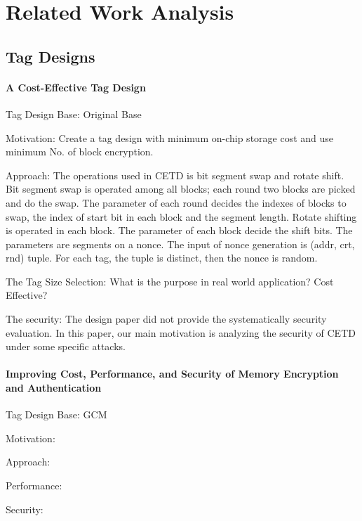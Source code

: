 \documentclass{article}
\begin{document}
\section{Related Work Analysis}
\subsection{Tag Designs}
\paragraph{A Cost-Effective Tag Design}
Tag Design Base: Original Base

Motivation: Create a tag design with minimum on-chip storage cost and use
minimum No. of block encryption.

Approach: The operations used in CETD is bit segment swap and rotate shift. Bit segment swap is operated among all blocks; each round two blocks are picked and do the swap. The parameter of each round decides the indexes of blocks to swap, the index of start bit in each block and the segment length. Rotate shifting is operated in each block. The parameter of each block decide the shift bits.
The parameters are segments on a nonce. The input of nonce generation is (addr, crt, rnd) tuple. For each tag, the tuple is distinct, then the nonce is random.

The Tag Size Selection: What is the purpose in real world application? Cost Effective?

The security: The design paper did not provide the systematically security evaluation. In this paper, our main motivation is analyzing the security of CETD under some specific attacks.
\paragraph{Improving Cost, Performance, and Security of Memory Encryption and Authentication}
Tag Design Base: GCM

Motivation:

Approach:

Performance:

Security: 
\end{document}

